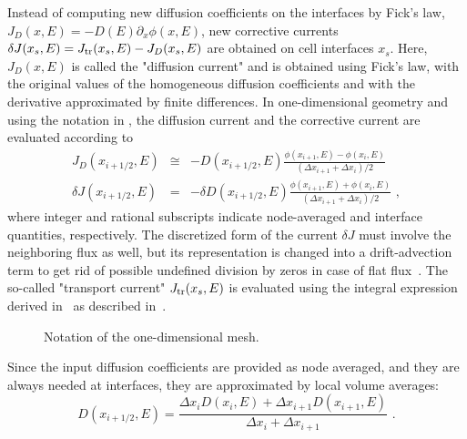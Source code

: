 Instead of computing new diffusion coefficients on the interfaces by Fick's law, $J_D(x,E) = -D(E) \partial_x \phi(x,E)$, new corrective currents $\delta J(x_s,E) = J_{\textrm{\scriptsize{tr}}}(x_s,E) - J_D(x_s,E)$ are obtained on cell interfaces $x_s$. Here, $J_D(x,E)$ is called the "diffusion current" and is obtained using Fick's law, with the original values of the homogeneous diffusion coefficients and with the derivative approximated by finite differences. In one-dimensional 
geometry and using the notation in , the diffusion current and the corrective current are evaluated according to
\begin{eqnarray}\label{eq:JD-dJ}
J_D(x_{i+1/2},E) &\cong& -D(x_{i+1/2},E) 
\frac{\phi(x_{i+1},E) - \phi(x_i,E)}
{(\Delta x_{i+1} + \Delta x_i)/2} \nonumber \\
\delta J(x_{i+1/2},E) &=& -\delta D(x_{i+1/2},E) 
\frac{\phi(x_{i+1},E) + \phi(x_i,E)}
{(\Delta x_{i+1} + \Delta x_i)/2} \,\, ,
\end{eqnarray}
where integer and rational subscripts indicate node-averaged and interface quantities, respectively. The discretized form of the current $\delta J$ must involve the neighboring flux as well, but its representation is changed into a drift-advection term to get rid of possible undefined division by zeros in case of flat flux~\cite{Smith-1983,Tomatis-2011}. The so-called "transport current" $J_{\textrm{\scriptsize{tr}}}(x_s,E)$ is evaluated using the integral expression derived in~ as described in~.

\begin{figure}[htbp!] 
	\centering
	\caption{Notation of the one-dimensional mesh.}
	\label{fig:mesh1D}
\end{figure}
%
Since the input diffusion coefficients are provided as node averaged, and they are always needed at interfaces, they are approximated by local volume averages:
\begin{equation}\label{eq:Ds}
D(x_{i+1/2},E) = \frac{\Delta x_i D(x_i,E) 
	+ \Delta x_{i+1} D(x_{i+1},E)}
{ \Delta x_i + \Delta x_{i+1}} \,\, .
\end{equation}

